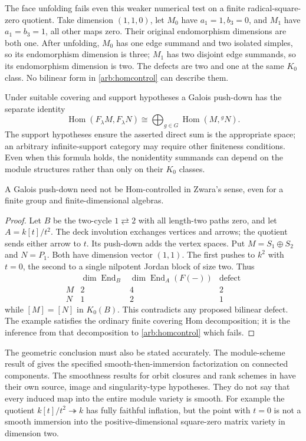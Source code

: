 The face unfolding fails even this weaker numerical test on a finite
radical-square-zero quotient. Take dimension $(1,1,0)$, let $M_0$ have
$a_1=1,b_3=0$, and $M_1$ have $a_1=b_3=1$, all other maps zero. Their original
endomorphism dimensions are both one. After unfolding, $M_0$ has one edge
summand and two isolated simples, so its endomorphism dimension is three;
$M_1$ has two disjoint edge summands, so its endomorphism dimension is two.
The defects are two and one at the same $K_0$ class. No bilinear form in
\eqref{arb:homcontrol} can describe them.

Under suitable covering and support hypotheses a Galois push-down has the
separate identity
\[
 \operatorname{Hom}(F_\lambda M,F_\lambda N)
   \cong\bigoplus_{g\in G}\operatorname{Hom}(M,{}^gN).
\]
The support hypotheses ensure the asserted direct sum is the appropriate
space; an arbitrary infinite-support category may require other finiteness
conditions. Even when this formula holds, the nonidentity summands can depend
on the module structures rather than only on their $K_0$ classes.

\begin{proposition}\label{arb:covercounter}
A Galois push-down need not be Hom-controlled in Zwara's sense, even for a
finite group and finite-dimensional algebras.
\end{proposition}
\begin{proof}
Let $B$ be the two-cycle $1\rightleftarrows2$ with all length-two paths zero,
and let $A=k[t]/t^2$. The deck involution exchanges vertices and arrows; the
quotient sends either arrow to $t$. Its push-down adds the vertex spaces.
Put $M=S_1\oplus S_2$ and $N=P_1$. Both have dimension vector $(1,1)$.
The first pushes to $k^2$ with $t=0$, the second to a single nilpotent Jordan
block of size two. Thus
\[
 \begin{array}{c|cc|c}
 &\dim\operatorname{End}_B&\dim\operatorname{End}_A(F(-))&\text{defect}\\\hline
 M&2&4&2\\N&1&2&1
 \end{array}
\]
while $[M]=[N]$ in $K_0(B)$. This contradicts any proposed bilinear defect.
The example satisfies the ordinary finite covering Hom decomposition; it is
the inference from that decomposition to \eqref{arb:homcontrol} which fails.
\end{proof}

The geometric conclusion must also be stated accurately. The module-scheme
result of \cite{ARBZwara} gives the specified smooth-then-immersion
factorization on connected components. The smoothness results for orbit
closures and rank schemes in \cite[Theorems 6.1--6.2]{ARBRiedtmannZwara} have
their own source, image and singularity-type hypotheses. They do not say that
every induced map into the entire module variety is smooth. For example the
quotient $k[t]/t^2\twoheadrightarrow k$ has fully faithful inflation, but the
point with $t=0$ is not a smooth immersion into the positive-dimensional
square-zero matrix variety in dimension two.

